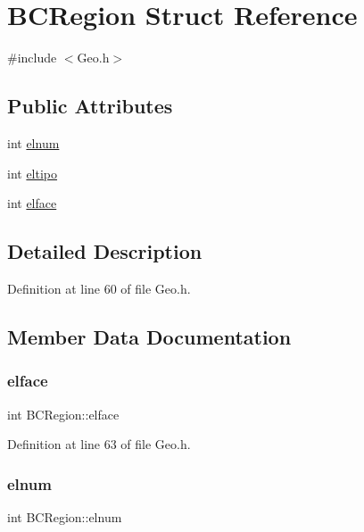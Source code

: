 \hypertarget{structBCRegion}{}\section{B\+C\+Region Struct Reference}
\label{structBCRegion}


{\ttfamily \#include $<$Geo.\+h$>$}

\subsection*{Public Attributes}
\begin{DoxyCompactItemize}
\item 
int \hyperlink{structBCRegion_a25bdd11842ad98226597c51d138281d3}{elnum}
\item 
int \hyperlink{structBCRegion_a7826a11d6afcbcad4c4b306cd191c6d6}{eltipo}
\item 
int \hyperlink{structBCRegion_adb28246d37496ce55332a94a9b2b4ba1}{elface}
\end{DoxyCompactItemize}


\subsection{Detailed Description}


Definition at line 60 of file Geo.\+h.



\subsection{Member Data Documentation}
\mbox{\label{structBCRegion_adb28246d37496ce55332a94a9b2b4ba1}} 
\subsubsection{\texorpdfstring{elface}{elface}}
{\footnotesize\ttfamily int B\+C\+Region\+::elface}



Definition at line 63 of file Geo.\+h.

\mbox{\label{structBCRegion_a25bdd11842ad98226597c51d138281d3}} 
\subsubsection{\texorpdfstring{elnum}{elnum}}
{\footnotesize\ttfamily int B\+C\+Region\+::elnum}



